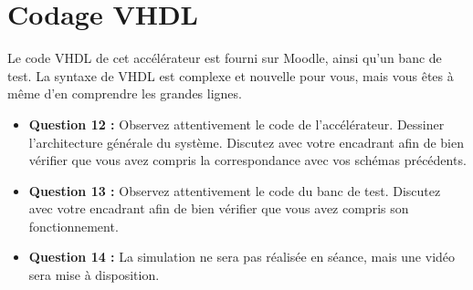 \documentclass[a4paper,11pt]{article}
\newif\ifsolutions
\begin{document}
\ifsolutions
\begin{solbox}
\textbf{Question 9 :} Par exemple, avec $n=8$ et $n'=8$, $s_n, s_{n'} \in \{0 \dots 255\}$ et $s_n+s_{n'} \in \{0 \dots 510\}$. On se convainc facilement que le nombre de bits pour le résultat de l'addition est $\mathbf{max(n,n')+1}$.

\vspace{0.5em}
\textbf{Question 10 :} Pour la multiplication le résultat est $\mathbf{n+n'}$.

\vspace{0.5em}
\textbf{Question 11 :} À la fin de chaque CSTEP, la dynamique des signaux calculés augmente. Si chaque entrée est codée sur un même nombre $n$ de bits :
\begin{itemize}
    \item CSTEP 1 : R3 nécessite $2n+1$ bits
    \item CSTEP 2 : R3 nécessite $(2n+1)+n+1=3n+2$ bits
    \item CSTEP 3 : R3 nécessite $(3n+2)+n+1=4n+3$ bits
\end{itemize}
À titre d'exemple, partant de $n=8$ bits, on obtient \textbf{35 bits} nécessaires en sortie.
\end{solbox}
\fi


\section{Codage VHDL}

Le code VHDL de cet accélérateur est fourni sur Moodle, ainsi qu'un banc de test. La syntaxe de VHDL est complexe et nouvelle pour vous, mais vous êtes à même d'en comprendre les grandes lignes.

\begin{questionbox}
\begin{itemize}
    \item \textbf{Question 12 :} Observez attentivement le code de l'accélérateur. Dessiner l'architecture générale du système. Discutez avec votre encadrant afin de bien vérifier que vous avez compris la correspondance avec vos schémas précédents.
    \item \textbf{Question 13 :} Observez attentivement le code du banc de test. Discutez avec votre encadrant afin de bien vérifier que vous avez compris son fonctionnement.
    \item \textbf{Question 14 :} La simulation ne sera pas réalisée en séance, mais une vidéo sera mise à disposition.
\end{itemize}
\end{questionbox}
\end{document}
